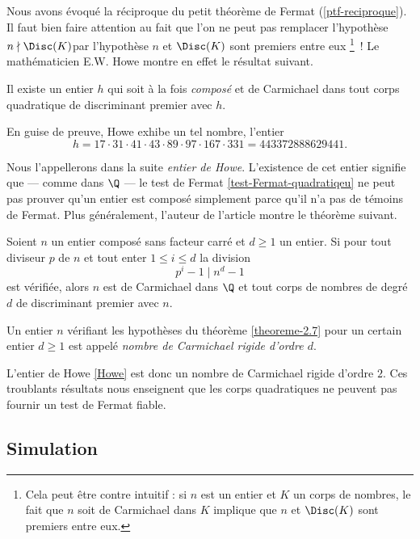 Nous avons évoqué la réciproque du petit théorème de Fermat (\ref{ptf-reciproque}). Il faut bien faire attention au fait que l'on ne peut pas remplacer l'hypothèse \og $n \nmid \Disc(K)$\fg par l'hypothèse \og $n$ et $\Disc(K)$ sont premiers entre eux \fg \footnote{Cela peut être contre intuitif : si $n$ est un entier et $K$ un corps de nombres, le fait que $n$ soit de Carmichael dans $K$ implique que $n$ et $\Disc(K)$ sont premiers entre eux.}~! Le mathématicien E.W. Howe montre en effet le résultat suivant.

\begin{theoreme}[Howe, 200]
	Il existe un entier $h$ qui soit à la fois \emph{composé} et de Carmichael dans tout corps quadratique de discriminant premier avec $h$.
\end{theoreme}

En guise de preuve, Howe exhibe un tel nombre, l'entier 
	\begin{equation}\label{Howe}
		h = 17 \cdot 31 \cdot 41 \cdot 43 \cdot 89 \cdot 97 \cdot 167 \cdot 331 = 443372888629441.
	\end{equation}

Nous l'appellerons dans la suite \emph{entier de Howe}. L'existence de cet entier signifie que — comme dans $\Q$ — le test de Fermat \ref{test-Fermat-quadratiqeu} ne peut pas prouver qu'un entier est composé simplement parce qu'il n'a pas de témoins de Fermat. Plus généralement, l'auteur de l'article montre le théorème suivant.

\begin{theoreme}\label{theoreme-2.7}
	Soient $n$ un entier composé sans facteur carré et $d\geq 1$ un entier. Si pour tout diviseur $p$ de $n$ et tout enter $1\leq i \leq d$ la division $$p^i - 1\mid n^d - 1$$ est vérifiée, alors $n$ est de Carmichael dans $\Q$ et tout corps de nombres de degré $d$ de discriminant premier avec $n$.
\end{theoreme}

\begin{definition}
	Un entier $n$ vérifiant les hypothèses du théorème \ref{theoreme-2.7} pour un certain entier $d\geq 1$ est appelé \emph{nombre de Carmichael rigide d'ordre $d$}.
\end{definition}

L'entier de Howe \ref{Howe} est donc un nombre de Carmichael rigide d'ordre $2$. Ces troublants résultats nous enseignent que les corps quadratiques ne peuvent pas fournir un test de Fermat fiable. 

\subsection{Simulation}

